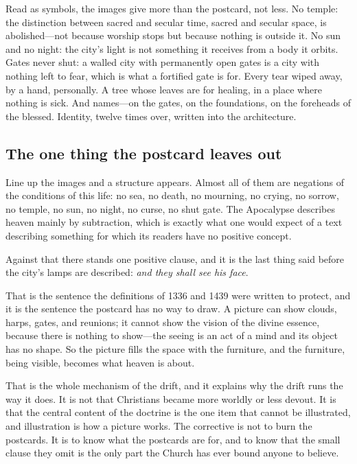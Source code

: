 Read as symbols, the images give more than the postcard, not less. No temple: the distinction between sacred and secular time, sacred and secular space, is abolished---not because worship stops but because nothing is outside it. No sun and no night: the city's light is not something it receives from a body it orbits. Gates never shut: a walled city with permanently open gates is a city with nothing left to fear, which is what a fortified gate is for. Every tear wiped away, by a hand, personally. A tree whose leaves are for healing, in a place where nothing is sick. And names---on the gates, on the foundations, on the foreheads of the blessed. Identity, twelve times over, written into the architecture.

\subsection{The one thing the postcard leaves out}

Line up the images and a structure appears. Almost all of them are negations of the conditions of this life: no sea, no death, no mourning, no crying, no sorrow, no temple, no sun, no night, no curse, no shut gate. The Apocalypse describes heaven mainly by subtraction, which is exactly what one would expect of a text describing something for which its readers have no positive concept.

Against that there stands one positive clause, and it is the last thing said before the city's lamps are described: \emph{and they shall see his face}.

That is the sentence the definitions of 1336 and 1439 were written to protect, and it is the sentence the postcard has no way to draw. A picture can show clouds, harps, gates, and reunions; it cannot show the vision of the divine essence, because there is nothing to show---the seeing is an act of a mind and its object has no shape. So the picture fills the space with the furniture, and the furniture, being visible, becomes what heaven is about.

That is the whole mechanism of the drift, and it explains why the drift runs the way it does. It is not that Christians became more worldly or less devout. It is that the central content of the doctrine is the one item that cannot be illustrated, and illustration is how a picture works. The corrective is not to burn the postcards. It is to know what the postcards are for, and to know that the small clause they omit is the only part the Church has ever bound anyone to believe.
